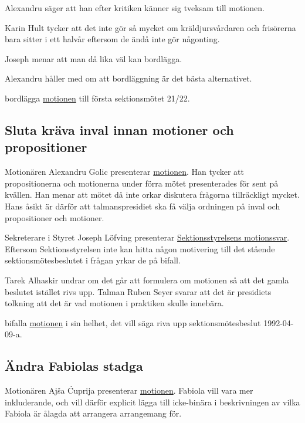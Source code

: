 \documentclass[hidelinks]{sektionsmote}
\begin{document}
Alexandru säger att han efter kritiken känner sig tveksam till motionen.

Karin Hult tycker att det inte gör så mycket om kräldjursvårdaren och frisörerna bara sitter i ett halvår eftersom de ändå inte gör någonting.

Joseph menar att man då lika väl kan bordlägga.

Alexandru håller med om att bordläggning är det bästa alternativet.

\begin{beslut}
  \item bordlägga \hyperlink{bilagor/motion/a.pdf.1}{motionen} till första sektionsmötet 21/22.
\end{beslut}

\subsection{Sluta kräva inval innan motioner och propositioner}
Motionären Alexandru Golic presenterar \hyperlink{bilagor/motion/b.pdf.1}{motionen}.
Han tycker att propositionerna och motionerna under förra mötet presenterades för sent på kvällen.
Han menar att mötet då inte orkar diskutera frågorna tillräckligt mycket.
Hans åsikt är därför att talmanspresidiet ska få välja ordningen på inval och propositioner och motioner.

Sekreterare i Styret Joseph Löfving presenterar \hyperlink{bilagor/motion/bsvar.pdf.1}{Sektionsstyrelsens motionssvar}.
Eftersom Sektionsstyrelsen inte kan hitta någon motivering till det stående sektionsmötesbeslutet i frågan yrkar de på bifall.

Tarek Alhaskir undrar om det går att formulera om motionen så att det gamla beslutet istället rivs upp.
Talman Ruben Seyer svarar att det är presidiets tolkning att det är vad motionen i praktiken skulle innebära.

\begin{beslut}
  \item bifalla \hyperlink{bilagor/motion/b.pdf.1}{motionen} i sin helhet, det vill säga riva upp sektionsmötesbeslut 1992-04-09-a.
\end{beslut}

\subsection{Ändra Fabiolas stadga}
Motionären Ajša Ćuprija presenterar \hyperlink{bilagor/motion/c.pdf.1}{motionen}.
Fabiola vill vara mer inkluderande, och vill därför explicit lägga till icke-binära i beskrivningen av vilka Fabiola är ålagda att arrangera arrangemang för.
\end{document}
